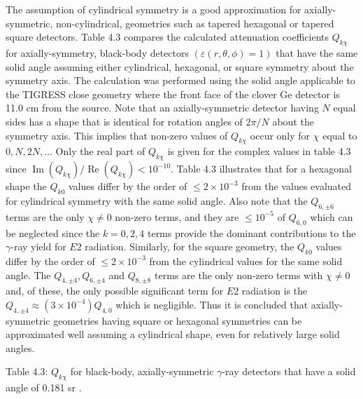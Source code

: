 \documentclass[10pt]{article}
\begin{document}
The assumption of cylindrical symmetry is a good approximation for axially-symmetric, non-cylindrical, geometries such as tapered hexagonal or tapered square detectors. Table 4.3 compares the calculated attenuation coefficients $Q_{k \chi}$ for axially-symmetry, black-body detectors $(\varepsilon(r, \theta, \phi)=1)$ that have the same solid angle assuming either cylindrical, hexagonal, or square symmetry about the symmetry axis. The calculation was performed using the solid angle applicable to the TIGRESS close geometry where the front face of the clover Ge detector is 11.0 cm from the source. Note that an axially-symmetric detector having $N$ equal sides has a shape that is identical for rotation angles of $2 \pi / N$ about the symmetry axis. This implies that non-zero values of $Q_{k \chi}$ occur only for $\chi$ equal to $0, N, 2 N, \ldots$ Only the real part of $Q_{k \chi}$ is given for the complex values in table 4.3 since $\operatorname{Im}\left(Q_{k \chi}\right) / \operatorname{Re}\left(Q_{k \chi}\right)<10^{-10}$. Table 4.3 illustrates that for a hexagonal shape the $Q_{k 0}$ values differ by the order of $\leq 2 \times 10^{-3}$ from the values evaluated for cylindrical symmetry with the same solid angle. Also note that the $Q_{6, \pm 6}$ terms are the only $\chi \neq 0$ non-zero terms, and they are $\leq 10^{-5}$ of $Q_{6,0}$ which can be neglected since the $k=0,2,4$ terms provide the dominant contributions to the $\gamma$-ray yield for $E 2$ radiation. Similarly, for the square geometry, the $Q_{k 0}$ values differ by the order of $\leq 2 \times 10^{-3}$ from the cylindrical values for the same solid angle. The $Q_{4, \pm 4}, Q_{6, \pm 4}$ and $Q_{8, \pm 8}$ terms are the only non-zero terms with $\chi \neq 0$ and, of these, the only possible significant term for $E 2$ radiation is the $Q_{4, \pm 4} \approx\left(3 \times 10^{-4}\right) Q_{4,0}$ which is negligible. Thus it is concluded that axially-symmetric geometries having square or hexagonal symmetries can be approximated well assuming a cylindrical shape, even for relatively large solid angles.

Table 4.3: $Q_{k \chi}$ for black-body, axially-symmetric $\gamma$-ray detectors that have a solid angle of 0.181 sr .
\end{document}
